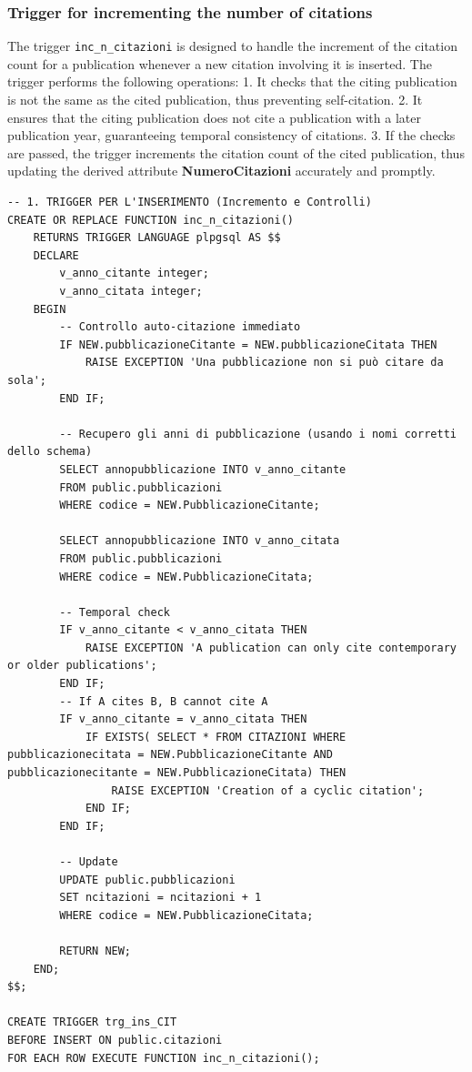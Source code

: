 \documentclass[a4paper,12pt]{article}
\begin{document}
\subsubsection{Trigger for incrementing the number of citations}
The trigger \texttt{inc\_n\_citazioni} is designed to handle the increment of the citation count for a publication whenever a new citation involving it is inserted. The trigger performs the following operations:
1. It checks that the citing publication is not the same as the cited publication, thus preventing self-citation.
2. It ensures that the citing publication does not cite a publication with a later publication year, guaranteeing temporal consistency of citations.
3. If the checks are passed, the trigger increments the citation count of the cited publication, thus updating the derived attribute \textbf{NumeroCitazioni} accurately and promptly.\\
\begin{lstlisting}
-- 1. TRIGGER PER L'INSERIMENTO (Incremento e Controlli)
CREATE OR REPLACE FUNCTION inc_n_citazioni()
    RETURNS TRIGGER LANGUAGE plpgsql AS $$
    DECLARE
        v_anno_citante integer;
        v_anno_citata integer;
    BEGIN
        -- Controllo auto-citazione immediato
        IF NEW.pubblicazioneCitante = NEW.pubblicazioneCitata THEN
            RAISE EXCEPTION 'Una pubblicazione non si può citare da sola';
        END IF;

        -- Recupero gli anni di pubblicazione (usando i nomi corretti dello schema)
        SELECT annopubblicazione INTO v_anno_citante 
        FROM public.pubblicazioni 
        WHERE codice = NEW.PubblicazioneCitante;

        SELECT annopubblicazione INTO v_anno_citata 
        FROM public.pubblicazioni 
        WHERE codice = NEW.PubblicazioneCitata;

        -- Temporal check
        IF v_anno_citante < v_anno_citata THEN
            RAISE EXCEPTION 'A publication can only cite contemporary or older publications';
        END IF;
        -- If A cites B, B cannot cite A
        IF v_anno_citante = v_anno_citata THEN
            IF EXISTS( SELECT * FROM CITAZIONI WHERE pubblicazionecitata = NEW.PubblicazioneCitante AND pubblicazionecitante = NEW.PubblicazioneCitata) THEN
                RAISE EXCEPTION 'Creation of a cyclic citation';
            END IF;
        END IF;

        -- Update
        UPDATE public.pubblicazioni
        SET ncitazioni = ncitazioni + 1
        WHERE codice = NEW.PubblicazioneCitata;

        RETURN NEW;
    END;
$$;

CREATE TRIGGER trg_ins_CIT
BEFORE INSERT ON public.citazioni
FOR EACH ROW EXECUTE FUNCTION inc_n_citazioni();

\end{lstlisting}
\end{document}
